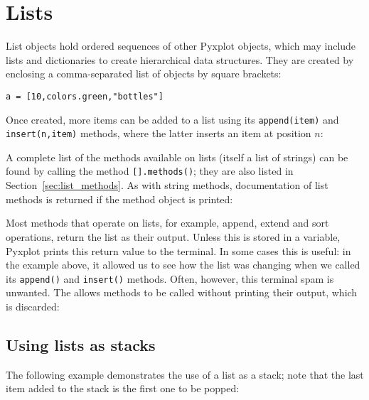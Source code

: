 \section{Lists}

List objects hold ordered sequences of other Pyxplot objects, which may
include lists and dictionaries to create hierarchical data structures. They are
created by enclosing a comma-separated list of objects by square brackets:

\begin{verbatim}
a = [10,colors.green,"bottles"]
\end{verbatim}

Once created, more items can be added to a list using its {\tt append(item)}
and {\tt insert(n,item)} methods, where the latter inserts an item at position
$n$:

\vspace{3mm}

\vspace{3mm}

\noindent
A complete list of the methods available on lists (itself a list of strings)
can be found by calling the method {\tt [].methods()}; they are also listed in
Section~\ref{sec:list_methods}. As with string methods, documentation of list
methods is returned if the method object is printed:

\vspace{3mm}

\vspace{3mm}

Most methods that operate on lists, for example, append, extend and sort
operations, return the list as their output. Unless this is stored in a
variable, Pyxplot prints this return value to the terminal. In some cases this
is useful: in the example above, it allowed us to see how the list was changing
when we called its {\tt append()} and {\tt insert()} methods. Often, however,
this terminal spam is unwanted. The  allows methods to be called
without printing their output, which is discarded:

\vspace{3mm}

\vspace{3mm}

\subsection{Using lists as stacks}

The following example demonstrates the use of a list as a stack; note that the
last item added to the stack is the first one to be popped:

